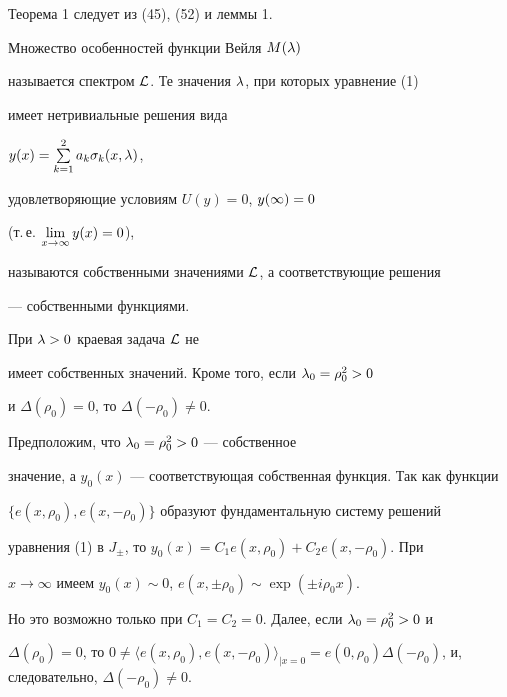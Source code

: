 Теорема 1 следует из (45), (52) и леммы 1.





\begin{defn}


Множество особенностей функции Вейля $M(\lambda)$


называется спектром ${\cal L}$. Те значения $\lambda$, при которых уравнение (1)


имеет нетривиальные решения вида


$y(x)=\sum\limits_{k=1}^{2}a_k \sigma_k(x,\lambda)$,


удовлетворяющие условиям $U(y)=0$, $y(\infty)=0$


(т.\,е. $\lim\limits_{x\to\infty} y(x)=0$),


называются собственными значениями ${\cal L}$, а соответствующие решения


--- собственными функциями.


\end{defn}





\begin{thm}


При $\lambda>0$ краевая задача ${\cal L}$ не


имеет собственных значений. Кроме того, если $\lambda_0=\rho_0^2>0$


и $\Delta(\rho_0)=0$, то $\Delta(-\rho_0)\ne 0$.


\end{thm}





\begin{pf}


Предположим, что $\lambda_0 =\rho_0^2 >0$ --- собственное


значение, а $y_0(x)$ --- соответствующая собственная функция. Так как функции


$\{e(x,\rho_0), e(x,-\rho_0)\}$ образуют фундаментальную систему решений


уравнения (1) в $J_{\pm}$, то $y_0(x)=C_1e(x,\rho_0)+C_2e(x,-\rho_0)$. При


$x\to\infty$ имеем $y_0(x)\sim 0$, $e(x,\pm\rho_0)\sim\exp(\pm i\rho_0 x)$.


Но это возможно только при $C_1=C_2=0$. Далее, если $\lambda_0 =\rho_0^2 >0$ и


$\Delta(\rho_0)=0$, то $0\ne\langle e(x,\rho_0), e(x,-\rho_0)\rangle_{|x=0}


=e(0,\rho_0)\Delta(-\rho_0)$, и, следовательно, $\Delta(-\rho_0)\ne 0$.


\end{pf}





